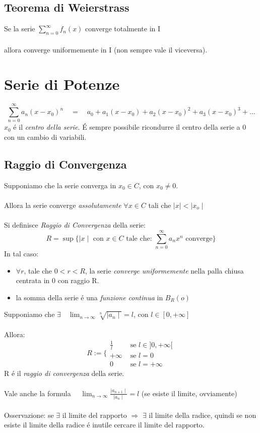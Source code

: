 \documentclass[a4paper,10pt,italian]{article}
\begin{document}
\subsection{Teorema di Weierstrass}
Se la serie $\sum_{n=0}^{\infty}f_n(x)$ converge totalmente in I \\ \\
allora converge uniformemente in I (non sempre vale il viceversa).

\section{Serie di Potenze}
$$\sum_{n=0}^{\infty} a_n(x-x_0)^n \quad = \quad a_0 + a_1(x-x_0) + a_2(x-x_0)^2 + a_3(x-x_0)^3 + ...$$
$x_0$ \'e il \emph{centro della serie}. \'E sempre possibile ricondurre il centro della serie a 0 con un cambio di variabili.

\subsection{Raggio di Convergenza}
Supponiamo che la serie converga in $x_0 \in C$, con $x_0 \neq 0$. \\ \\
Allora la serie converge \emph{assolutamente} $\forall x \in C$ tali che $\mid x \mid < \mid x_o \mid$ \\ \\
Si definisce \emph{Raggio di Convergenza} della serie:
$$ R = \sup\{ \mid x \mid \mbox{ con }  x\in C \mbox{ tale che: } \sum_{n=0}^{\infty} a_nx^n \mbox{ converge} \} $$
In tal caso:
\begin{itemize}
\item $\forall r$, tale che $0<r<R$, la serie \emph{converge uniformemente} nella palla chiusa centrata in 0 con raggio R.
\item la somma della serie \'e una \emph{funzione continua} in $B_R(o)$
\end{itemize} 
Supponiamo che $\exists \quad \lim_{n\rightarrow\infty}\sqrt[n]{\mid a_n \mid} = l$, con $l \in [0, +\infty]$ \\ \\
Allora:
$$ R := \Bigg\{
\begin{array}{ll}
\frac{1}{l} & \mbox{ se } l\in ]0, +\infty[ \\
+\infty &\mbox{ se } l=0 \\
0 &\mbox{ se }l=+\infty
\end{array}
$$
R \'e il \emph{raggio di convergenza} della serie. \\ \\
Vale anche la formula $\quad \lim_{n\rightarrow\infty} \frac{\mid a_{n+1} \mid}{\mid a_n \mid} = l$ (se esiste il limite, ovviamente) \\ \\
Osservazione: se $\exists$ il limite del rapporto $\Rightarrow$ $\exists$ il limite della radice, quindi se non esiste il limite 
della radice \'e inutile cercare il limite del rapporto.
\end{document}
